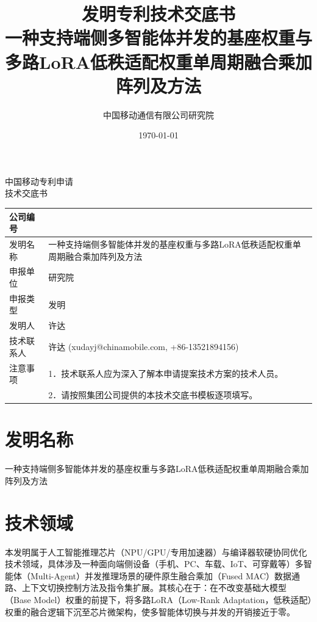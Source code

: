 \documentclass[12pt,a4paper]{article}
\title{\textbf{发明专利技术交底书} \\[0.5em]
\Large 一种支持端侧多智能体并发的基座权重与多路LoRA低秩适配权重单周期融合乘加阵列及方法}
\author{中国移动通信有限公司研究院}
\date{\today}
\begin{document}
\begin{center}
    {\Large\heiti 中国移动专利申请} \\[1em]
    {\Huge\heiti 技术交底书} \\[1em]
\end{center}

\noindent
\begin{tabular}{|p{3cm}|p{12cm}|}
\hline
公司编号 &  \\
\hline
发明名称 & 一种支持端侧多智能体并发的基座权重与多路LoRA低秩适配权重单周期融合乘加阵列及方法 \\
\hline
申报单位 & 研究院 \\
\hline
申报类型 & 发明 \\
\hline
发明人 & 许达 \\
\hline
技术联系人 & 许达 (xudayj@chinamobile.com, +86-13521894156) \\
\hline
注意事项 & 1．技术联系人应为深入了解本申请提案技术方案的技术人员。 \\
         & 2．请按照集团公司提供的本技术交底书模板逐项填写。 \\
\hline
\end{tabular}

\vspace{1cm}

\section{发明名称}

一种支持端侧多智能体并发的基座权重与多路LoRA低秩适配权重单周期融合乘加阵列及方法

\section{技术领域}

本发明属于人工智能推理芯片（NPU/GPU/专用加速器）与编译器软硬协同优化技术领域，具体涉及一种面向端侧设备（手机、PC、车载、IoT、可穿戴等）多智能体（Multi-Agent）并发推理场景的硬件原生融合乘加（Fused MAC）数据通路、上下文切换控制方法及指令集扩展。其核心在于：在不改变基础大模型（Base Model）权重的前提下，将多路LoRA（Low-Rank Adaptation，低秩适配）权重的融合逻辑下沉至芯片微架构，使多智能体切换与并发的开销接近于零。
\end{document}
